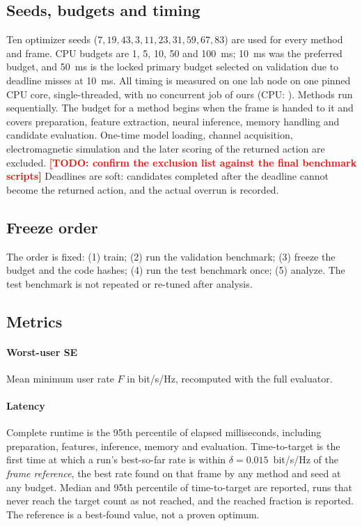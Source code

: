 \documentclass[conference]{IEEEtran}
\newcommand{\margin}{\delta}
\newcommand{\TODO}[1]{\textbf{\textcolor{red}{[TODO: #1]}}}
\begin{document}
\subsection{Seeds, budgets and timing}
Ten optimizer seeds ($7, 19, 43, 3, 11, 23, 31, 59, 67, 83$) are used for every method and frame. CPU budgets are 1, 5, 10, 50 and 100~ms; 10~ms was the preferred budget, and 50~ms is the locked primary budget selected on validation due to deadline misses at 10~ms. All timing is measured on one lab node on one pinned CPU core, single-threaded, with no concurrent job of ours (CPU: \resHardwareCPU). Methods run sequentially. The budget for a method begins when the frame is handed to it and covers preparation, feature extraction, neural inference, memory handling and candidate evaluation. One-time model loading, channel acquisition, electromagnetic simulation and the later scoring of the returned action are excluded. \TODO{confirm the exclusion list against the final benchmark scripts} Deadlines are soft: candidates completed after the deadline cannot become the returned action, and the actual overrun is recorded.

\subsection{Freeze order}
The order is fixed: (1) train; (2) run the validation benchmark; (3) freeze the budget and the code hashes; (4) run the test benchmark once; (5) analyze. The test benchmark is not repeated or re-tuned after analysis.

\subsection{Metrics}
\paragraph{Worst-user SE} Mean minimum user rate $F$ in bit/s/Hz, recomputed with the full evaluator.
\paragraph{Latency} Complete runtime is the 95th percentile of elapsed milliseconds, including preparation, features, inference, memory and evaluation. Time-to-target is the first time at which a run's best-so-far rate is within $\margin=0.015$~bit/s/Hz of the \emph{frame reference}, the best rate found on that frame by any method and seed at any budget. Median and 95th percentile of time-to-target are reported, runs that never reach the target count as not reached, and the reached fraction is reported. The reference is a best-found value, not a proven optimum.
\end{document}
